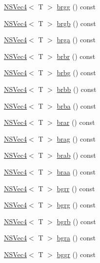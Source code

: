 \begin{DoxyCompactItemize}
\item 
\hyperlink{structNSVec4}{N\-S\-Vec4}$<$ T $>$ \hyperlink{structNSVec4_a65fd3d6a33a8b6452fc7545afe5a76f9}{brgg} () const 
\item 
\hyperlink{structNSVec4}{N\-S\-Vec4}$<$ T $>$ \hyperlink{structNSVec4_aaa515ee1af6146d58e036139740ec831}{brgb} () const 
\item 
\hyperlink{structNSVec4}{N\-S\-Vec4}$<$ T $>$ \hyperlink{structNSVec4_aee8f35891bae08928f6e48e576690088}{brga} () const 
\item 
\hyperlink{structNSVec4}{N\-S\-Vec4}$<$ T $>$ \hyperlink{structNSVec4_a106fe05c91044f94a2a36645c8d2364e}{brbr} () const 
\item 
\hyperlink{structNSVec4}{N\-S\-Vec4}$<$ T $>$ \hyperlink{structNSVec4_ac66d28d86d56e529c80e5c02c6200d1b}{brbg} () const 
\item 
\hyperlink{structNSVec4}{N\-S\-Vec4}$<$ T $>$ \hyperlink{structNSVec4_a876ba59e893f9a16de71141a62871a9e}{brbb} () const 
\item 
\hyperlink{structNSVec4}{N\-S\-Vec4}$<$ T $>$ \hyperlink{structNSVec4_a51220245981c6f78fc200cbaa5e4085d}{brba} () const 
\item 
\hyperlink{structNSVec4}{N\-S\-Vec4}$<$ T $>$ \hyperlink{structNSVec4_a641896f104718fe360d2bd771f938a35}{brar} () const 
\item 
\hyperlink{structNSVec4}{N\-S\-Vec4}$<$ T $>$ \hyperlink{structNSVec4_a87bd681c9b644479ee1001dc6c5a9aca}{brag} () const 
\item 
\hyperlink{structNSVec4}{N\-S\-Vec4}$<$ T $>$ \hyperlink{structNSVec4_ab82c84e77d04028794f8170b3eadb0ca}{brab} () const 
\item 
\hyperlink{structNSVec4}{N\-S\-Vec4}$<$ T $>$ \hyperlink{structNSVec4_a9e2a1f33f7a1966b712d454fc0dd6859}{braa} () const 
\item 
\hyperlink{structNSVec4}{N\-S\-Vec4}$<$ T $>$ \hyperlink{structNSVec4_af2dd756c447cd36165da402b980970db}{bgrr} () const 
\item 
\hyperlink{structNSVec4}{N\-S\-Vec4}$<$ T $>$ \hyperlink{structNSVec4_a15b89a0adae7cca872638f452ce08413}{bgrg} () const 
\item 
\hyperlink{structNSVec4}{N\-S\-Vec4}$<$ T $>$ \hyperlink{structNSVec4_a53048634e4ad670c8fd6b0f3ebd08bca}{bgrb} () const 
\item 
\hyperlink{structNSVec4}{N\-S\-Vec4}$<$ T $>$ \hyperlink{structNSVec4_af9b5742862edebaf6c106326b9d5d103}{bgra} () const 
\item 
\hyperlink{structNSVec4}{N\-S\-Vec4}$<$ T $>$ \hyperlink{structNSVec4_a9f47b7a713ca2349e6ad990afdc7e683}{bggr} () const 

\end{DoxyCompactItemize}

